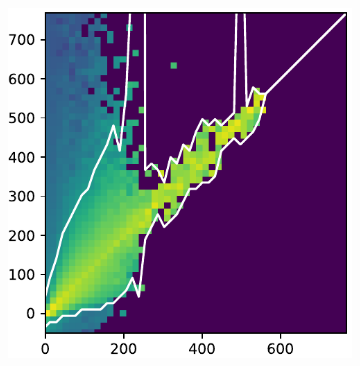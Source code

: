 \documentclass[10pt,letterpaper]{article}
\begin{document}
\begin{figure}[h!]
\begin{subfigure}[t]{0.288\textwidth}
					\end{subfigure}
					~ 
					\begin{subfigure}[t]{0.288\textwidth}
						\centering
						\includegraphics[width=\textwidth]{fig/hist_2}
					\end{subfigure}
					~ 
					\begin{subfigure}[t]{0.079\textwidth}
						\centering

\end{subfigure}
\end{figure}
\end{document}
